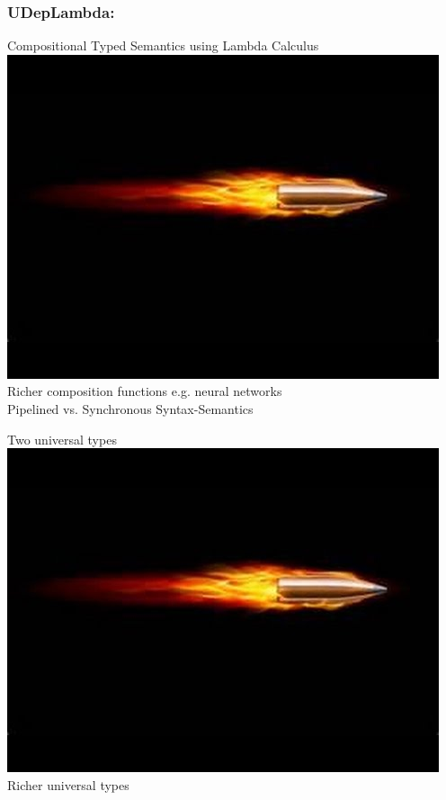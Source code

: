 \documentclass[mathserif,12pt]{beamer}
\begin{document}
\begin{frame}
  \frametitle{UDepLambda:  }
\large
Compositional Typed Semantics using Lambda Calculus \\
\pause
\includegraphics[trim=16em 14em 4em 10em,clip=true,scale=0.2]{figures/bullet}\; Richer composition functions e.g. neural networks\\
\hspace{3.7em} Pipelined vs. Synchronous Syntax-Semantics

\vspace{2em}
\pause
Two universal types\\
\pause
\includegraphics[trim=16em 14em 4em 10em,clip=true,scale=0.2]{figures/bullet}\; Richer universal types


\end{frame}
\end{document}
